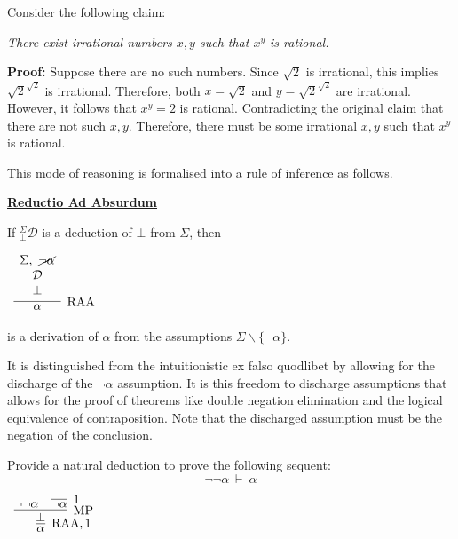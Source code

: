 \documentclass{book}
\begin{document}
    \begin{eg}

        Consider the following claim:

        \begin{center}
            \emph{There exist irrational numbers $x,y$ such that $x^{y}$ is rational.}
        \end{center}
        
        {\bf Proof:} Suppose there are no such numbers. Since $\sqrt{2}$ is irrational, this implies $\sqrt{2}^{\sqrt{2}}$ is irrational. Therefore, both $x = \sqrt{2}$ and $y = \sqrt{2}^{\sqrt{2}}$ are irrational. However, it follows that $x^{y} = 2$ is rational. Contradicting the original claim that there are not such $x,y$. Therefore, there must be some irrational $x,y$ such that $x^{y}$ is rational. 
    \end{eg}

    This mode of reasoning is formalised into a rule of inference as follows. 

    \begin{mdframed}
        \underline{{\bf Reductio Ad Absurdum}}

        If $^{\Sigma}_{\bot}\mathcal{D}$ is a deduction of $\bot$ from $\Sigma$, then

        \begin{center}		
            $\begin{array}{c}		
            \infer[\RAA]{\alpha}
            {\begin{array}{c} \Sigma, \ \cancel{\lnot\alpha} \\ \mathcal{D} \\ \bot \end{array}}
            \end{array}$
        \end{center}  

        is a derivation of $\alpha$ from the assumptions $\Sigma \backslash\{\lnot\alpha\}$.
    \end{mdframed}

    It is distinguished from the intuitionistic ex falso quodlibet by allowing for the discharge of the $\lnot\alpha$ assumption. It is this freedom to discharge assumptions that allows for the proof of theorems like double negation elimination and the logical equivalence of contraposition. Note that the discharged assumption must be the negation of the conclusion. 

    \begin{eg}
        Provide a natural deduction to prove the following sequent: $$\lnot\lnot\alpha \ \vdash \ \alpha$$

        \begin{center}
            $\begin{array}{c}
                \infer[\RAA,1]{\alpha}
                    {\infer[\MP]{\bot}
                        {\lnot\lnot \alpha
                        &
                        \infer[1]{\lnot\alpha}{}}}
            \end{array}$
        \end{center}
    \end{eg}
\end{document}
